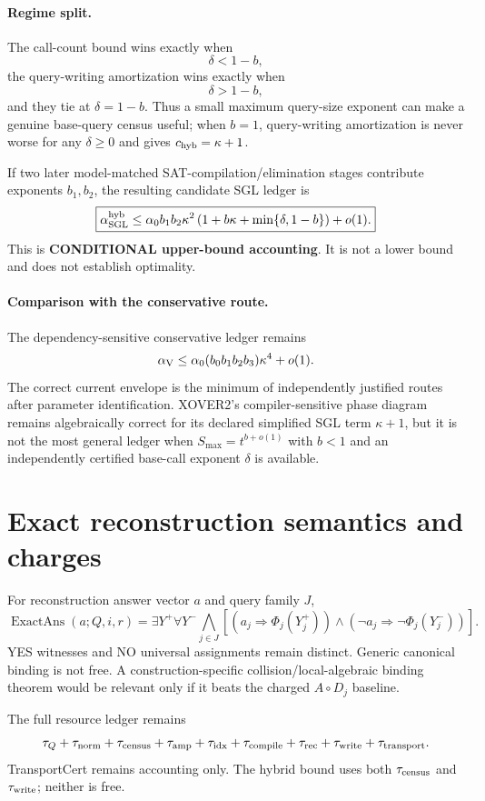 \documentclass[11pt]{article}
\begin{document}
\paragraph{Regime split.}
The call-count bound wins exactly when
\[
\delta<1-b,
\]
the query-writing amortization wins exactly when
\[
\delta>1-b,
\]
and they tie at $\delta=1-b$. Thus a small maximum query-size exponent can make a genuine base-query census useful; when $b=1$, query-writing amortization is never worse for any $\delta\ge0$ and gives $c_{\rm hyb}=\kappa+1$.

If two later model-matched SAT-compilation/elimination stages contribute exponents $b_1,b_2$, the resulting candidate SGL ledger is
\[
\boxed{
\alpha_{\rm SGL}^{\rm hyb}
\le
\alpha_0 b_1b_2\kappa^2
\left(1+b\kappa+\min\{\delta,1-b\}\right)+o(1).
}
\]
This is \textbf{CONDITIONAL upper-bound accounting}. It is not a lower bound and does not establish optimality.

\paragraph{Comparison with the conservative route.}
The dependency-sensitive conservative ledger remains
\[
\alpha_{\rm V}
\le
\alpha_0(b_0b_1b_2b_3)\kappa^4+o(1).
\]
The correct current envelope is the minimum of independently justified routes after parameter identification. XOVER2's compiler-sensitive phase diagram remains algebraically correct for its declared simplified SGL term $\kappa+1$, but it is not the most general ledger when $S_{\max}=t^{b+o(1)}$ with $b<1$ and an independently certified base-call exponent $\delta$ is available.

\section*{Exact reconstruction semantics and charges}
For reconstruction answer vector $a$ and query family $J$,
\[
\operatorname{ExactAns}(a;Q,i,r)
=
\exists Y^+\forall Y^-
\bigwedge_{j\in J}
\left[
(a_j\Rightarrow\Phi_j(Y_j^+))
\wedge
(\neg a_j\Rightarrow\neg\Phi_j(Y_j^-))
\right].
\]
YES witnesses and NO universal assignments remain distinct. Generic canonical binding is not free. A construction-specific collision/local-algebraic binding theorem would be relevant only if it beats the charged $A\circ D_j$ baseline.

The full resource ledger remains
\[
\tau_Q+\tau_{\rm norm}+\tau_{\rm census}
+\tau_{\rm amp}+\tau_{\rm idx}
+\tau_{\rm compile}+\tau_{\rm rec}
+\tau_{\rm write}+\tau_{\rm transport}.
\]
TransportCert remains accounting only. The hybrid bound uses both $\tau_{\rm census}$ and $\tau_{\rm write}$; neither is free.
\end{document}
